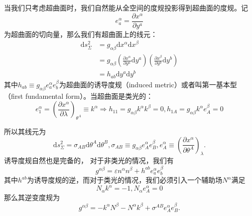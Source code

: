 \documentclass[hyperref, UTF8, a4paper]{ctexart}
\begin{document}
当我们只考虑超曲面时，我们自然能从全空间的度规投影得到超曲面的度规。记
\begin{equation*}
	e_{a}^{\alpha } =\frac{\partial x^{\alpha }}{\partial y^{a}}
\end{equation*}
为超曲面的切向量，那么我们有超曲面上的线元：
\begin{equation*}
	\begin{aligned}
		\mathrm{d} s_{\Sigma }^{2} & =g_{\alpha \beta }\mathrm{d} x^{\alpha }\mathrm{d} x^{\beta }\\
		& =g_{\alpha \beta }\left(\frac{\partial x^{\alpha }}{\partial y^{a}}\mathrm{d} y^{a}\right)\left(\frac{\partial x^{\beta }}{\partial y^{b}}\mathrm{d} y^{b}\right)\\
		& =h_{ab}\mathrm{d} y^{a}\mathrm{d} y^{b}
	\end{aligned}
\end{equation*}
其中$h_{ab} \equiv g_{\alpha \beta } e_{a}^{\alpha } e_{b}^{\beta }$为超曲面的诱导度规（induced metric）或者叫第一基本型（first fundamental form）。当超曲面是类光的：\begin{equation*}
	e_{1}^{\alpha } =\left(\frac{\partial x^{\alpha }}{\partial \lambda }\right)_{\theta ^{A}} \equiv k^{\alpha } \Rightarrow h_{11} =g_{\alpha \beta } k^{\alpha } k^{\beta } =0,h_{1A} =g_{\alpha \beta } k^{\alpha } e_{A}^{\beta } =0
\end{equation*}

所以其线元为
\begin{equation*}
	\mathrm{d} s_{\Sigma }^{2} =\sigma _{AB}\mathrm{d} \theta ^{A}\mathrm{d} \theta ^{B} ,\sigma _{AB} \equiv g_{\alpha \beta } e_{A}^{\alpha } e_{B}^{\beta } ,e_{A}^{\alpha } \equiv \left(\frac{\partial x^{\alpha }}{\partial \theta ^{A}}\right)_{\lambda } .
\end{equation*}
诱导度规自然也是完备的， 对于非类光的情况，我们有
\begin{equation*}
	g^{\alpha \beta } =\varepsilon n^{\alpha } n^{\beta } +h^{ab} e_{a}^{\alpha } e_{b}^{\beta }
\end{equation*}
其中$h^{ab}$为诱导度规的逆，而对于类光的情况，我们必须引入一个辅助场$N^{\alpha }$满足
\begin{equation*}
	N_{\alpha } k^{\alpha } =-1,N_{\alpha } e_{A}^{\alpha } =0
\end{equation*}
那么其逆变度规为
\begin{equation*}
	g^{\alpha \beta } =-k^{\alpha } N^{\beta } -N^{\alpha } k^{\beta } +\sigma ^{AB} e_{A}^{\alpha } e_{B}^{\beta } .
\end{equation*}
\end{document}
